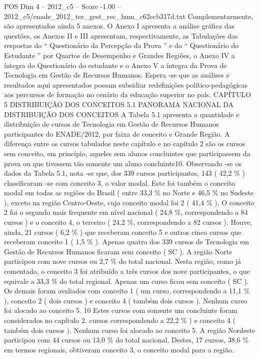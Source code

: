 \begin{textsample}{POS Dim 4 – 2012\_c5 – Score -1.00 – 2012\_c5/enade\_2012\_tec\_gest\_rec\_hum\_c62ecb317d.txt}
Complementarmente, são apresentados ainda 5 anexos.
O Anexo I apresenta a análise gráfica das questões, os Anexos II e III apresentam, respectivamente, as Tabulações das respostas do “ Questionário da Percepção da Prova ” e do “ Questionário do Estudante ” por Quartos de Desempenho e Grandes Regiões, o Anexo IV a íntegra do Questionário do estudante e o Anexo V a íntegra da Prova de Tecnologia em Gestão de Recursos Humanos.
Espera -se que as análises e resultados aqui apresentados possam subsidiar redefinições político-pedagógicas aos percursos de formação no cenário da educação superior no país.
CAPÍTULO 5 DISTRIBUIÇÃO DOS CONCEITOS 5.1 PANORAMA NACIONAL DA DISTRIBUIÇÃO DOS CONCEITOS A Tabela 5.1 apresenta a quantidade e distribuição de cursos de Tecnologia em Gestão de Recursos Humanos participantes do ENADE/2012, por faixa de conceito e Grande Região.
A diferença entre os cursos tabulados neste capítulo e no capítulo 2 são os cursos sem conceito, em princípio, aqueles sem alunos concluintes que participassem da prova ou que tivessem tão somente um aluno concluinte10.
Observando -se os dados da Tabela 5.1, nota -se que, dos 339 cursos participantes, 143 ( 42,2 \% ) classificaram -se com conceito 3, o valor modal.
Este foi também o conceito modal em todas as regiões do Brasil ( entre 33,3 \% no Norte e 46,5 \% no Sudeste ), exceto na região Centro-Oeste, cujo conceito modal foi 2 ( 41,4 \% ).
O conceito 2 foi o segundo mais frequente em nível nacional ( 24,8 \%, correspondendo a 84 cursos ) e o conceito 4, o terceiro ( 24,2 \%, correspondendo a 82 cursos ).
Houve, ainda, 21 cursos ( 6,2 \% ) que receberam conceito 5 e outros cinco cursos que receberam conceito 1 ( 1,5 \% ).
Apenas quatro dos 339 cursos de Tecnologia em Gestão de Recursos Humanos ficaram sem conceito ( SC ).
A região Norte participou com nove cursos ou 2,7 \% do total nacional.
Nesta região, como já comentado, o conceito 3 foi atribuído a três cursos dos nove participantes, o que equivale a 33,3 \% do total regional.
Apenas um curso ficou sem conceito ( SC ).
Os demais foram avaliados com conceito 1 ( um curso, correspondendo a 11,1 \% ), conceito 2 ( dois cursos ) e conceito 4 ( também dois cursos ).
Nenhum curso foi alocado ao conceito 5. 10 Estes cursos com somente um concluinte foram considerados no capítulo 2. cursos correspondendo a 22,2 \% ) e conceito 4 ( também dois cursos ).
Nenhum curso foi alocado ao conceito 5.
A região Nordeste participou com 44 cursos ou 13,0 \% do total nacional.
Destes, 17 cursos, 38,6 \% em termos regionais, obtiveram conceito 3, o conceito modal para a região.

\end{textsample}
